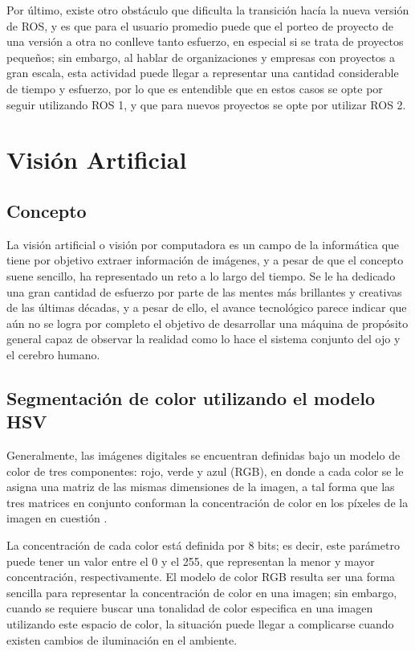 Por último, existe otro obstáculo que dificulta la transición hacía la nueva versión de ROS, y es que para el usuario promedio puede que el porteo de proyecto de una versión a otra no conlleve tanto esfuerzo, en especial si se trata de proyectos pequeños; sin embargo, al hablar de organizaciones y empresas con proyectos a gran escala, esta actividad puede llegar a representar una cantidad considerable de tiempo y esfuerzo, por lo que es entendible que en estos casos se opte por seguir utilizando ROS 1, y que para nuevos proyectos se opte por utilizar ROS 2.

\section{Visión Artificial}

\subsection{Concepto}

La visión artificial o visión por computadora es un campo de la informática que tiene por objetivo extraer información de imágenes, y a pesar de que el concepto suene sencillo, ha representado un reto a lo largo del tiempo. Se le ha dedicado una gran cantidad de esfuerzo por parte de las mentes más brillantes y creativas de las últimas décadas, y a pesar de ello, el avance tecnológico parece indicar que aún no se logra por completo el objetivo de desarrollar una máquina de propósito general capaz de observar la realidad como lo hace el sistema conjunto del ojo y el cerebro humano.



\subsection{Segmentación de color utilizando el modelo HSV}

Generalmente, las imágenes digitales se encuentran definidas bajo un modelo de color de tres componentes: rojo, verde y azul (RGB), en donde a cada color se le asigna una matriz de las mismas dimensiones de la imagen, a tal forma que las tres matrices en conjunto conforman la concentración de color en los píxeles de la imagen en cuestión \cite{saravanakumar2011multiple}.

La concentración de cada color está definida por 8 bits; es decir, este parámetro puede tener un valor entre el 0 y el 255, que representan la menor y mayor concentración, respectivamente. El modelo de color RGB resulta ser una forma sencilla para representar la concentración de color en una imagen; sin embargo, cuando se requiere buscar una tonalidad de color especifica en una imagen utilizando este espacio de color, la situación puede llegar a complicarse cuando existen cambios de iluminación en el ambiente. 

